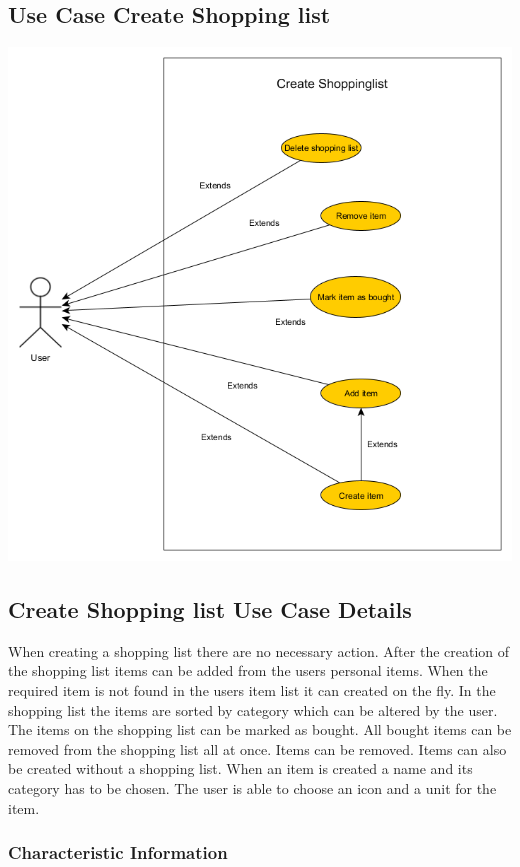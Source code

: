 \documentclass[12pt]{article}
\theoremstyle{definition}
\begin{document}
\subsection{Use Case Create Shopping list}

\includegraphics[scale=.5]{UseCaseCreateShoppinglist.png}\\

\subsection{Create Shopping list Use Case Details}

When creating a shopping list there are no necessary action. After the creation of the shopping list items can be added from the users personal items. When the required item is not found in the users item list it can created on the fly. In the shopping list the items are sorted by category which can be altered by the user. The items on the shopping list can be marked as bought. All bought items can be removed from the shopping list all at once. Items can be removed. Items can also be created without a shopping list. When an item is created a name and its category has to be chosen. The user is able to choose an icon and a unit for the item.

\subsubsection{Characteristic Information}
\end{document}
